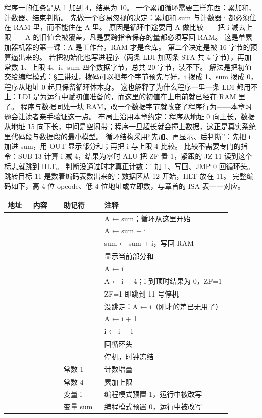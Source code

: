 程序一的任务是从 1 加到 4，结果为 10。
一个累加循环需要三样东西：累加和、计数器、结束判断。
先做一个容易忽视的决定：累加和 sum 与计数器 i 都必须住在 RAM 里，而不能住在 A 里。
原因是循环中途要用 A 做比较——把 i 减去上限——A 的旧值会被覆盖，凡是要跨指令保存的量都必须写回 RAM。
这是单累加器机器的第一课：A 是工作台，RAM 才是仓库。
第二个决定是被 16 字节的预算逼出来的。
若把初始化也写进程序（两条 LDI 加两条 STA 共 4 字节），再加常数 1、上限 4、i、sum 四个数据字节，总共 20 字节，装不下。
解法是把初值交给编程模式：§三讲过，拨码可以把每个字节预先写好，i 拨成 1、sum 拨成 0，程序从地址 0 起只保留循环体本身。
这也解释了为什么程序一里一条 LDI 都用不上：LDI 是为运行中赋初值准备的，而这里的初值在上电前就已经在 RAM 里了。
程序与数据同处一块 RAM，改一个数据字节就改变了程序行为——本章习题会让读者亲手验证这一点。
布局上沿用本章约定：程序从地址 0 向上长，数据从地址 15 向下长，中间是空闲带；程序一旦超长就会撞上数据，这正是真实系统里代码段与数据段的最小模型。
循环结构采用“先加、再显示、后判断”：先把 i 加进 sum，用 OUT 显示部分和；再把 i 与上限 4 比较。
比较不需要专门的指令：SUB 13 计算 i 减 4，结果为零时 ALU 把 ZF 置 1，紧跟的 JZ 11 读到这个标志就跳到 HLT。
判断没通过时才真正计数：i 加 1、写回、JMP 0 回循环头。
跳转目标 11 是数着编码表数出来的：数据区从 12 开始，HLT 放在 11。
完整编码如下，高 4 位 opcode、低 4 位地址或立即数，与章首的 ISA 表一一对应。

\begin{longtable}{L{0.10\linewidth}L{0.12\linewidth}L{0.16\linewidth}L{0.50\linewidth}}
\toprule
地址 & 内容 & 助记符 & 注释 \\
\midrule
{} &  &  & A ← sum；循环从这里开始 \\
 &  &  & A ← sum + i \\
 &  &  & sum ← sum + i，写回 RAM \\
 &  &  & 显示当前部分和 \\
 &  &  & A ← i \\
 &  &  & A ← i − 4；i 到顶时结果为 0，ZF=1 \\
 &  &  & ZF=1 即跳到 11 号停机 \\
 &  &  & 没跳走：A ← i（刚才的差已无用了） \\
 &  &  & A ← i + 1 \\
 &  &  & i ← i + 1 \\
 &  &  & 回循环头 \\
 &  &  & 停机，时钟冻结 \\
 &  & 常数 1 & 计数增量 \\
 &  & 常数 4 & 累加上限 \\
 &  & 变量 i & 编程模式预置 1，运行中被改写 \\
 &  & 变量 sum & 编程模式预置 0，运行中被改写 \\
\bottomrule
\end{longtable}

